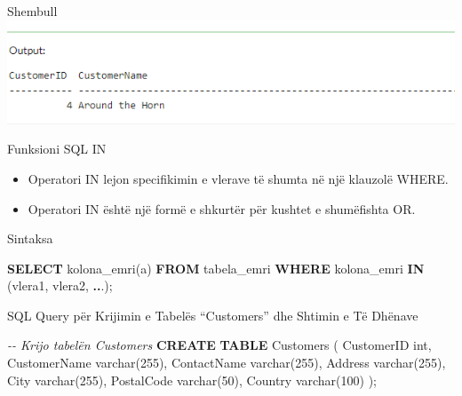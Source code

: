 \documentclass[
  ignorenonframetext,
]{beamer}
\newenvironment{Shaded}{\begin{snugshade}}{\end{snugshade}}
\newcommand{\CommentTok}[1]{\textcolor[rgb]{0.56,0.35,0.01}{\textit{#1}}}
\newcommand{\DataTypeTok}[1]{\textcolor[rgb]{0.13,0.29,0.53}{#1}}
\newcommand{\DecValTok}[1]{\textcolor[rgb]{0.00,0.00,0.81}{#1}}
\newcommand{\KeywordTok}[1]{\textcolor[rgb]{0.13,0.29,0.53}{\textbf{#1}}}
\newcommand{\NormalTok}[1]{#1}
\newcommand{\OperatorTok}[1]{\textcolor[rgb]{0.81,0.36,0.00}{\textbf{#1}}}
\begin{document}
\begin{frame}{Shembull}
\label{shembull-19}
\includegraphics{./Figs/query74.png}
\end{frame}

\begin{frame}{Funksioni SQL IN}
\label{funksioni-sql-in}
\begin{itemize}
\item
  Operatori IN lejon specifikimin e vlerave të shumta në një klauzolë
  WHERE.
\item
  Operatori IN është një formë e shkurtër për kushtet e shumëfishta OR.
\end{itemize}
\end{frame}

\begin{frame}[fragile]{Sintaksa}
\label{sintaksa-1}

\begin{Shaded}
\begin{Highlighting}[]
\KeywordTok{SELECT}\NormalTok{ kolona\_emri(a)}
\KeywordTok{FROM}\NormalTok{ tabela\_emri}
\KeywordTok{WHERE}\NormalTok{ kolona\_emri }\KeywordTok{IN}\NormalTok{ (vlera1, vlera2, }\OperatorTok{..}\NormalTok{.);}
\end{Highlighting}
\end{Shaded}
\end{frame}

\begin{frame}[fragile]{SQL Query për Krijimin e Tabelës ``Customers''
dhe Shtimin e Të Dhënave}
\label{sql-query-puxebr-krijimin-e-tabeluxebs-customers-dhe-shtimin-e-tuxeb-dhuxebnave-2}

\begin{Shaded}
\begin{Highlighting}[]
\CommentTok{{-}{-} Krijo tabelën Customers}
\KeywordTok{CREATE} \KeywordTok{TABLE}\NormalTok{ Customers (}
\NormalTok{    CustomerID }\DataTypeTok{int}\NormalTok{,}
\NormalTok{    CustomerName }\DataTypeTok{varchar}\NormalTok{(}\DecValTok{255}\NormalTok{),}
\NormalTok{    ContactName }\DataTypeTok{varchar}\NormalTok{(}\DecValTok{255}\NormalTok{),}
\NormalTok{    Address }\DataTypeTok{varchar}\NormalTok{(}\DecValTok{255}\NormalTok{),}
\NormalTok{    City }\DataTypeTok{varchar}\NormalTok{(}\DecValTok{255}\NormalTok{),}
\NormalTok{    PostalCode }\DataTypeTok{varchar}\NormalTok{(}\DecValTok{50}\NormalTok{),}
\NormalTok{    Country }\DataTypeTok{varchar}\NormalTok{(}\DecValTok{100}\NormalTok{)}
\NormalTok{);}
\end{Highlighting}
\end{Shaded}
\end{frame}
\end{document}
